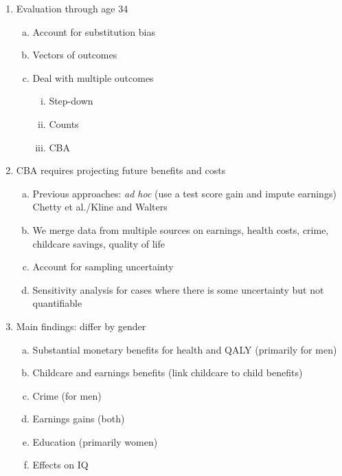 \begin{enumerate}[(1)]
\begin{enumerate}[(a)]
    \end{enumerate}
\item Evaluation through age 34
    \begin{enumerate}[(a)]
    \item Account for substitution bias
    \item Vectors of outcomes
    \item Deal with multiple outcomes
        \begin{enumerate}[(i)]
        \item Step-down
        \item Counts
        \item CBA
        \end{enumerate}
    \end{enumerate}
\item CBA requires projecting future benefits and costs
    \begin{enumerate}[(a)]
    \item Previous approaches: \emph{ad hoc} (use a test score gain and impute earnings) Chetty et al./Kline and Walters
    \item We merge data from multiple sources on earnings, health costs, crime, childcare savings, quality of life
    \item Account for sampling uncertainty
    \item Sensitivity analysis for cases where there is some uncertainty but not quantifiable
    \end{enumerate}
\item Main findings: differ by gender
    \begin{enumerate}[(a)]
    \item Substantial monetary benefits for health and QALY (primarily for men)
    \item Childcare and earnings benefits (link childcare to child benefits)
    \item Crime (for men)
    \item Earnings gains (both)
    \item Education (primarily women)
    \item Effects on IQ
    \end{enumerate}
\end{enumerate}

